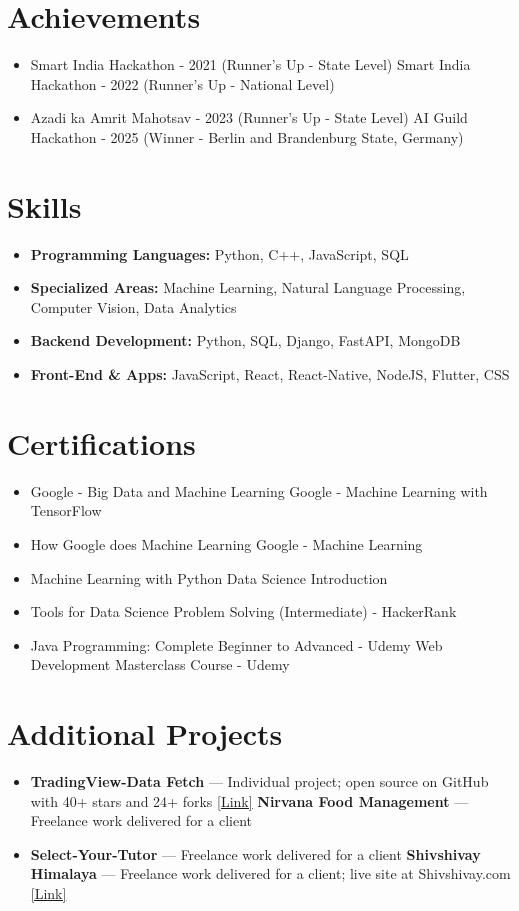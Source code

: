 \documentclass[a4paper,10pt]{article}
\begin{document}
\section*{Achievements}
\begin{itemize}
\item Smart India Hackathon - 2021 (Runner's Up - State Level) \hfill Smart India Hackathon - 2022 (Runner's Up - National Level)
\item Azadi ka Amrit Mahotsav - 2023 (Runner's Up - State Level) \hfill AI Guild Hackathon - 2025 (Winner - Berlin and Brandenburg State, Germany)
\end{itemize}

\section*{Skills}
\begin{itemize}
  \item \textbf{Programming Languages:} Python, C++, JavaScript, SQL
  \item \textbf{Specialized Areas:} Machine Learning, Natural Language Processing, Computer Vision, Data Analytics
  \item \textbf{Backend Development:} Python, SQL, Django, FastAPI, MongoDB
  \item \textbf{Front-End \& Apps:} JavaScript, React, React-Native, NodeJS, Flutter, CSS
\end{itemize}

\section*{Certifications}
\begin{itemize}
\item Google - Big Data and Machine Learning \hfill Google - Machine Learning with TensorFlow
\item How Google does Machine Learning \hfill Google - Machine Learning
\item Machine Learning with Python \hfill Data Science Introduction
\item Tools for Data Science \hfill Problem Solving (Intermediate) - HackerRank
\item Java Programming: Complete Beginner to Advanced - Udemy \hfill Web Development Masterclass Course - Udemy
\end{itemize}

\section*{Additional Projects}
\begin{itemize}
\item \textbf{TradingView-Data Fetch} — Individual project; open source on GitHub with 40+ stars and 24+ forks \href{https://github.com/ravalmeet/TradingView}{[Link]} \hfill \textbf{Nirvana Food Management} — Freelance work delivered for a client
\item \textbf{Select-Your-Tutor} — Freelance work delivered for a client \hfill \textbf{Shivshivay Himalaya} — Freelance work delivered for a client; live site at Shivshivay.com \href{Shivshivay.com}{[Link]}
\end{itemize}
\end{document}
